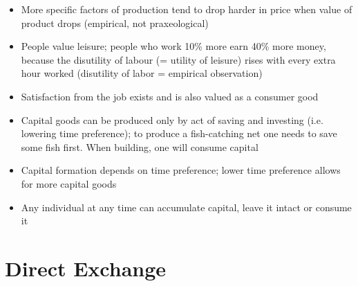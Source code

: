\documentclass[]{article}
\begin{document}
\begin{itemize}
    \item More specific factors of production tend to drop harder in price when value of product drops (empirical, not praxeological)
    \item People value leisure; people who work 10\% more earn 40\% more money, because the disutility of labour (= utility of leisure) rises with every extra hour worked (disutility of labor = empirical observation)
    \item Satisfaction from the job exists and is also valued as a consumer good
    \item Capital goods can be produced only by act of saving and investing (i.e. lowering time preference); to produce a fish-catching net one needs to save some fish first. When building, one will consume capital
    \item Capital formation depends on time preference; lower time preference allows for more capital goods
    \item Any individual at any time can accumulate capital, leave it intact or consume it
\end{itemize}

\newpage

\section{Direct Exchange}
\end{document}
